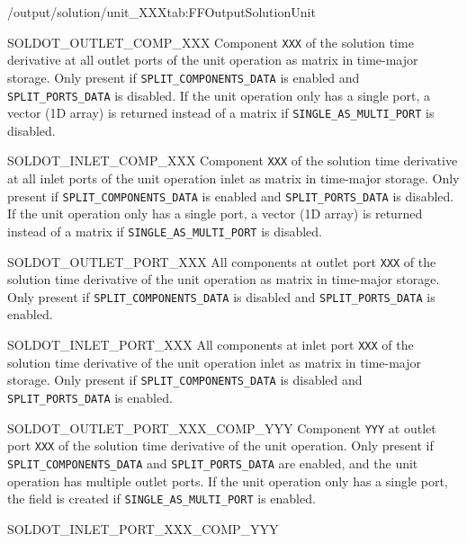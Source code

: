 \begin{groupscope}{/output/solution/unit\_XXX}{tab:FFOutputSolutionUnit}
\begin{dataset}[type=double,unit={\si{\mol\per\cubic\metre\of{IV}\per\second}}]{SOLDOT\_OUTLET\_COMP\_XXX}
    Component \texttt{XXX} of the solution time derivative at all outlet ports of the unit operation as matrix in time-major storage.
    Only present if \texttt{SPLIT\_COMPONENTS\_DATA} is enabled and \texttt{SPLIT\_PORTS\_DATA} is disabled.
    If the unit operation only has a single port, a vector (1D array) is returned instead of a matrix if \texttt{SINGLE\_AS\_MULTI\_PORT} is disabled.
  \end{dataset}
  \begin{dataset}[type=double,unit={\si{\mol\per\cubic\metre\of{IV}\per\second}}]{SOLDOT\_INLET\_COMP\_XXX}
    Component \texttt{XXX} of the solution time derivative at all inlet ports of the unit operation inlet as matrix in time-major storage.
    Only present if \texttt{SPLIT\_COMPONENTS\_DATA} is enabled and \texttt{SPLIT\_PORTS\_DATA} is disabled.
    If the unit operation only has a single port, a vector (1D array) is returned instead of a matrix if \texttt{SINGLE\_AS\_MULTI\_PORT} is disabled.
  \end{dataset}
  \begin{dataset}[type=double,unit={\si{\mol\per\cubic\metre\of{IV}\per\second}}]{SOLDOT\_OUTLET\_PORT\_XXX}
    All components at outlet port \texttt{XXX} of the solution time derivative of the unit operation as matrix in time-major storage.
    Only present if \texttt{SPLIT\_COMPONENTS\_DATA} is disabled and \texttt{SPLIT\_PORTS\_DATA} is enabled.
  \end{dataset}
  \begin{dataset}[type=double,unit={\si{\mol\per\cubic\metre\of{IV}\per\second}}]{SOLDOT\_INLET\_PORT\_XXX}
    All components at inlet port \texttt{XXX} of the solution time derivative of the unit operation inlet as matrix in time-major storage.
    Only present if \texttt{SPLIT\_COMPONENTS\_DATA} is disabled and \texttt{SPLIT\_PORTS\_DATA} is enabled.
  \end{dataset}
  \begin{dataset}[type=double,unit={\si{\mol\per\cubic\metre\of{IV}\per\second}}]{SOLDOT\_OUTLET\_PORT\_XXX\_COMP\_YYY}
    Component \texttt{YYY} at outlet port \texttt{XXX} of the solution time derivative of the unit operation.
    Only present if \texttt{SPLIT\_COMPONENTS\_DATA} and \texttt{SPLIT\_PORTS\_DATA} are enabled, and the unit operation has multiple outlet ports.
    If the unit operation only has a single port, the field is created if \texttt{SINGLE\_AS\_MULTI\_PORT} is enabled.
  \end{dataset}
  \begin{dataset}[type=double,unit={\si{\mol\per\cubic\metre\of{IV}\per\second}}]{SOLDOT\_INLET\_PORT\_XXX\_COMP\_YYY}

\end{dataset}
\end{groupscope}
